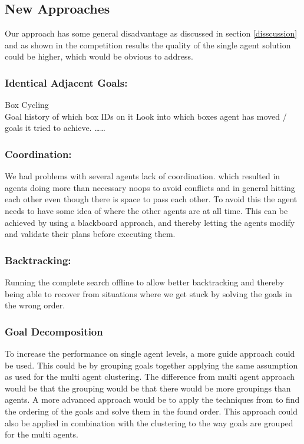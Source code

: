 \documentclass[letterpaper]{article}
\begin{document}
	\subsection{New Approaches}
		Our approach has some general disadvantage as discussed in section \ref{disscussion} and as shown in the competition results the quality of the single agent solution could be higher, which would be obvious to address.

		\subsubsection{Identical Adjacent Goals:}
			Box Cycling\\
			Goal history of which box IDs on it
			Look into which boxes agent has moved / goals it tried to achieve.
			\dots \dots
		\subsubsection{Coordination:}
			We had problems with several agents lack of coordination. which resulted in agents doing more than necessary noops to avoid conflicts and in general hitting each other even though there is space to pass each other. To avoid this the agent needs to have some idea of where the other agents are at all time. This can be achieved by using a  blackboard approach, and thereby letting the agents modify and validate their plans before executing them.
		\subsubsection{Backtracking:}
			Running the complete search offline to allow better backtracking and thereby being able to recover from situations where we get stuck by solving the goals in the wrong order. 

		\subsubsection{Goal Decomposition}
			To increase the performance on single agent levels, a more guide approach could be used. This could be by grouping goals together applying the same assumption as used for the multi agent clustering. The difference from multi agent approach would be that the grouping would be that there would be more groupings than agents. A more advanced approach would be to apply the techniques from \cite{Subgoals} to find the ordering of the goals and solve them in the found order. This approach could also be applied in combination with the clustering to the way goals are grouped for the multi agents.
			
\end{document}
